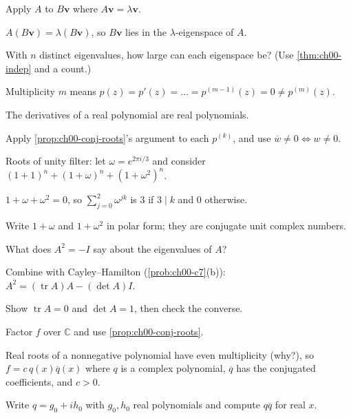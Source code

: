 \begin{hintlevels}
  \item Apply $A$ to $B\mathbf v$ where $A\mathbf v = \lambda\mathbf v$.
  \item $A(B\mathbf v) = \lambda(B\mathbf v)$, so $B\mathbf v$ lies in the
        $\lambda$-eigenspace of $A$.
  \item With $n$ distinct eigenvalues, how large can each eigenspace be?
        (Use \cref{thm:ch00-indep} and a count.)
\end{hintlevels}

\begin{hintlevels}
  \item Multiplicity $m$ means $p(z) = p'(z) = \dots = p^{(m-1)}(z) = 0\neq p^{(m)}(z)$.
  \item The derivatives of a real polynomial are real polynomials.
  \item Apply \cref{prop:ch00-conj-roots}'s argument to each $p^{(k)}$, and
        use $\overline{w}\neq 0 \iff w\neq 0$.
\end{hintlevels}

\begin{hintlevels}
  \item Roots of unity filter: let $\omega = e^{2\pi i/3}$ and consider
        $(1+1)^n + (1+\omega)^n + (1+\omega^2)^n$.
  \item $1 + \omega + \omega^2 = 0$, so $\sum_{j=0}^{2}\omega^{jk}$ is $3$ if
        $3\mid k$ and $0$ otherwise.
  \item Write $1 + \omega$ and $1 + \omega^2$ in polar form; they are
        conjugate unit complex numbers.
\end{hintlevels}

\begin{hintlevels}
  \item What does $A^2 = -I$ say about the eigenvalues of $A$?
  \item Combine with Cayley--Hamilton (\cref{prob:ch00-c7}(b)):
        $A^2 = (\operatorname{tr}A)A - (\det A)I$.
  \item Show $\operatorname{tr}A = 0$ and $\det A = 1$, then check the converse.
\end{hintlevels}

\begin{hintlevels}
  \item Factor $f$ over $\mathbb{C}$ and use \cref{prop:ch00-conj-roots}.
  \item Real roots of a nonnegative polynomial have even multiplicity (why?),
        so $f = c\,q(x)\overline{q}(x)$ where $q$ is a complex polynomial,
        $\overline q$ has the conjugated coefficients, and $c>0$.
  \item Write $q = g_0 + i h_0$ with $g_0,h_0$ real polynomials and compute
        $q\overline q$ for real $x$.
\end{hintlevels}

